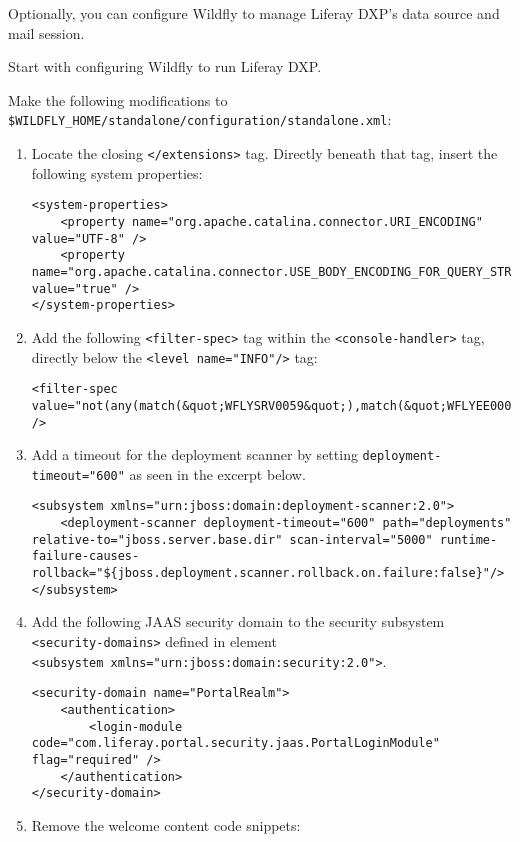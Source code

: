 Optionally, you can configure Wildfly to manage Liferay DXP's data
source and mail session.

Start with configuring Wildfly to run Liferay DXP.

Make the following modifications to
\texttt{\$WILDFLY\_HOME/standalone/configuration/standalone.xml}:

\begin{enumerate}
\def\labelenumi{\arabic{enumi}.}
\item
  Locate the closing \texttt{\textless{}/extensions\textgreater{}} tag.
  Directly beneath that tag, insert the following system properties:

\begin{verbatim}
<system-properties>
    <property name="org.apache.catalina.connector.URI_ENCODING" value="UTF-8" />
    <property name="org.apache.catalina.connector.USE_BODY_ENCODING_FOR_QUERY_STRING" value="true" />
</system-properties>
\end{verbatim}
\item
  Add the following \texttt{\textless{}filter-spec\textgreater{}} tag
  within the \texttt{\textless{}console-handler\textgreater{}} tag,
  directly below the
  \texttt{\textless{}level\ name="INFO"/\textgreater{}} tag:

\begin{verbatim}
<filter-spec value="not(any(match(&quot;WFLYSRV0059&quot;),match(&quot;WFLYEE0007&quot;)))" />
\end{verbatim}
\item
  Add a timeout for the deployment scanner by setting
  \texttt{deployment-timeout="600"} as seen in the excerpt below.

\begin{verbatim}
<subsystem xmlns="urn:jboss:domain:deployment-scanner:2.0">
    <deployment-scanner deployment-timeout="600" path="deployments" relative-to="jboss.server.base.dir" scan-interval="5000" runtime-failure-causes-rollback="${jboss.deployment.scanner.rollback.on.failure:false}"/>
</subsystem>
\end{verbatim}
\item
  Add the following JAAS security domain to the security subsystem
  \texttt{\textless{}security-domains\textgreater{}} defined in element
  \texttt{\textless{}subsystem\ xmlns="urn:jboss:domain:security:2.0"\textgreater{}}.

\begin{verbatim}
<security-domain name="PortalRealm">
    <authentication>
        <login-module code="com.liferay.portal.security.jaas.PortalLoginModule" flag="required" />
    </authentication>
</security-domain>
\end{verbatim}
\item
  Remove the welcome content code snippets:


\end{enumerate}
